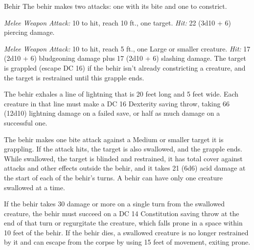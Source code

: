 \documentclass[10pt,a4paper,twoside,bg=print,twocolumn,openany,nodeprecatedcode]{dndbook}
\begin{document}
\begin{DndMonster}[float=t]{Behir}
\DndMonsterBasics[
armor-class = {17 (natural armor)},
hit-points = {\DndDice{16d12 + 64}},
speed = {50 ft., climb 40 ft.}
]
\DndMonsterAbilityScores[
 str = 23,
 dex = 16,
 con = 18,
 int = 7,
 wis = 14,
 cha = 12
]
\DndMonsterDetails[
skills = {Perception +6, Stealth +7},
damage-immunities = {lightning},
senses = {darkvision 90 ft., passive perception 16},
languages = {Draconic},
challenge = 11,
]
The behir makes two attacks: one with its bite and one to constrict.

\textsl{Melee Weapon Attack:} 10 to hit, reach 10 ft., one target. \textsl{Hit:} 22 (3d10 + 6) piercing damage.

\textsl{Melee Weapon Attack:} 10 to hit, reach 5 ft., one Large or smaller creature. \textsl{Hit:} 17 (2d10 + 6) bludgeoning damage plus 17 (2d10 + 6) slashing damage. The target is grappled (escape DC 16) if the behir isn't already constricting a creature, and the target is restrained until this grapple ends.

The behir exhales a line of lightning that is 20 feet long and 5 feet wide. Each creature in that line must make a DC 16 Dexterity saving throw, taking 66 (12d10) lightning damage on a failed save, or half as much damage on a successful one.

The behir makes one bite attack against a Medium or smaller target it is grappling. If the attack hits, the target is also swallowed, and the grapple ends. While swallowed, the target is blinded and restrained, it has total cover against attacks and other effects outside the behir, and it takes 21 (6d6) acid damage at the start of each of the behir's turns. A behir can have only one creature swallowed at a time.

If the behir takes 30 damage or more on a single turn from the swallowed creature, the behir must succeed on a DC 14 Constitution saving throw at the end of that turn or regurgitate the creature, which falls prone in a space within 10 feet of the behir. If the behir dies, a swallowed creature is no longer restrained by it and can escape from the corpse by using 15 feet of movement, exiting prone.

\end{DndMonster}
\end{document}
